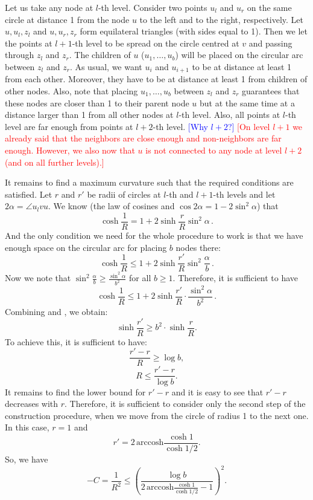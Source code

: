 \documentclass{article} %
\newcommand{\ph}[1]{\textcolor{blue}{#1}}
\newcommand{\lt}[1]{\textcolor{red}{#1}}
\begin{document}
Let us take any node at $l$-th level. Consider two points $u_l$ and $u_r$ on the same circle at distance 1 from the node $u$ to the left and to the right, respectively.
Let $u,u_l,z_l$ and $u,u_r,z_r$ form equilateral triangles (with sides equal to 1). Then we let the points at $l+1$-th level to be spread on the circle centred at $v$ and passing through $z_l$ and $z_r$. The children of $u$ ($u_1, \ldots, u_{b}$) will be placed on the circular arc between $z_l$ and $z_r$. As usual, we want $u_i$ and $u_{i+1}$ to be at distance at least 1 from each other. Moreover, they have to be at distance at least 1 from children of other nodes. Also, note that placing $u_1, \ldots, u_{b}$ between $z_l$ and $z_r$ guarantees that these nodes are closer than 1 to their parent node $u$ but at the same time at a distance larger than 1 from all other nodes at $l$-th level. Also, all points at $l$-th level are far enough from points at $l+2$-th level. \ph{[Why $l+2$?]} \lt{[On level $l+1$ we already said that the neighbors are close enough and non-neighbors are far enough. However, we also now that $u$ is not connected to any node at level $l+2$ (and on all further levels).]}

It remains to find a maximum curvature such that the required conditions are satisfied. Let $r$ and $r'$ be radii of circles at $l$-th and $l+1$-th levels and let $2\alpha = \angle u_l v u$. We know (the law of cosines and $\cos 2\alpha = 1 - 2\sin^2 \alpha$) that
\begin{equation}\label{eq:1}
\cosh \frac{1}{R} = 1 + 2 \sinh \frac{r}{R} \sin^2 \alpha \,.
\end{equation}
And the only condition we need for the whole procedure to work is that we have enough space on the circular arc for placing $b$ nodes there:
\[
\cosh \frac{1}{R} \le 1 + 2 \sinh \frac{r'}{R} \sin^2 \frac{\alpha}{b} \,.
\]
Now we note that $\sin^2 \frac{\alpha}{b} \ge \frac{\sin^2 \alpha}{b^2}$ for all $b \ge 1$. Therefore, it is sufficient to have
\begin{equation}\label{eq:2}
\cosh \frac{1}{R} \le 1 + 2 \sinh \frac{r'}{R} \cdot \frac{\sin^2 \alpha}{b^2} \,.
\end{equation}
Combining  and \lt{}, we obtain:
\[
\sinh \frac{r'}{R} \ge b^2 \cdot \sinh \frac{r}{R}.
\]
To achieve this, it is sufficient to have:
\[
\frac{r' - r}{R} \ge \log b,
\]
\[
R \le \frac{r' - r}{\log b}.
\]
It remains to find the lower bound for $r' - r$ and it is easy to see that $r' - r$ decreases with $r$. Therefore, it is sufficient to consider only the second step of the construction procedure, when we move from the circle of radius 1 to the next one. In this case, $r = 1$ and 
\[
r' = 2 \, \mathrm{arccosh} \frac{\cosh 1}{\cosh 1/2}.
\]
So, we have 
\[
-C = \frac{1}{R^2} \le \left( \frac{\log b}{2 \, \mathrm{arccosh} \frac{\cosh 1}{\cosh 1/2} - 1} \right)^2.
\]
\end{document}
